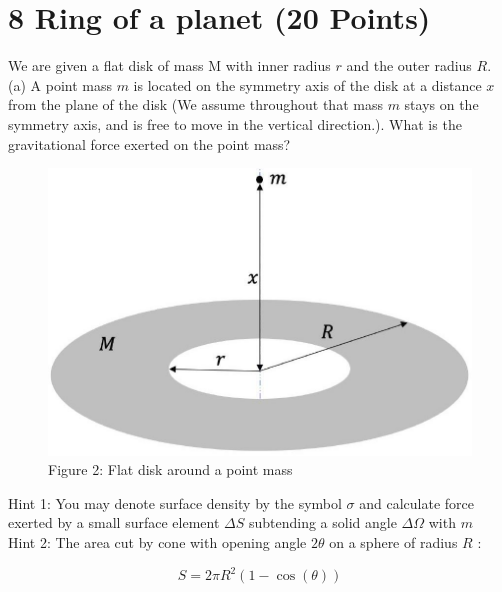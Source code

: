 \documentclass[10pt]{article}
\begin{document}
\section*{8 Ring of a planet (20 Points)}
We are given a flat disk of mass M with inner radius $r$ and the outer radius $R$.\\
(a) A point mass $m$ is located on the symmetry axis of the disk at a distance $x$ from the plane of the disk (We assume throughout that mass $m$ stays on the symmetry axis, and is free to move in the vertical direction.). What is the gravitational force exerted on the point mass?

\begin{figure}[h]
\begin{center}
  \includegraphics[width=\textwidth]{2025_09_11_6312450c103d6a7e5736g-05(1)}
\captionsetup{labelformat=empty}
\caption{Figure 2: Flat disk around a point mass}
\end{center}
\end{figure}

Hint 1: You may denote surface density by the symbol $\sigma$ and calculate force exerted by a small surface element $\Delta S$ subtending a solid angle $\Delta \Omega$ with $m$\\
Hint 2: The area cut by cone with opening angle $2 \theta$ on a sphere of radius $R$ :

$$
S=2 \pi R^{2}(1-\cos (\theta))
$$
\end{document}
